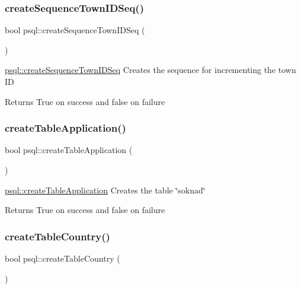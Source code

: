 \subsubsection{\texorpdfstring{create\+Sequence\+Town\+I\+D\+Seq()}{createSequenceTownIDSeq()}}
{\footnotesize\ttfamily bool psql\+::create\+Sequence\+Town\+I\+D\+Seq (\begin{DoxyParamCaption}{ }\end{DoxyParamCaption})}



\hyperlink{classpsql_a6ce21cb5a1e77cb0c280e2932d2b557d}{psql\+::create\+Sequence\+Town\+I\+D\+Seq} Creates the sequence for incrementing the town ID 

\begin{DoxyReturn}{Returns}
True on success and false on failure 
\end{DoxyReturn}
\mbox{\label{classpsql_a36f6a197a2214b9c71cfcd620334835d}} 
\subsubsection{\texorpdfstring{create\+Table\+Application()}{createTableApplication()}}
{\footnotesize\ttfamily bool psql\+::create\+Table\+Application (\begin{DoxyParamCaption}{ }\end{DoxyParamCaption})}



\hyperlink{classpsql_a36f6a197a2214b9c71cfcd620334835d}{psql\+::create\+Table\+Application} Creates the table \char`\"{}soknad\char`\"{} 

\begin{DoxyReturn}{Returns}
True on success and false on failure 
\end{DoxyReturn}
\mbox{\label{classpsql_ab6e496d8471f3cd9c5c082a6ba75c25b}} 
\subsubsection{\texorpdfstring{create\+Table\+Country()}{createTableCountry()}}
{\footnotesize\ttfamily bool psql\+::create\+Table\+Country (\begin{DoxyParamCaption}{ }\end{DoxyParamCaption})}




